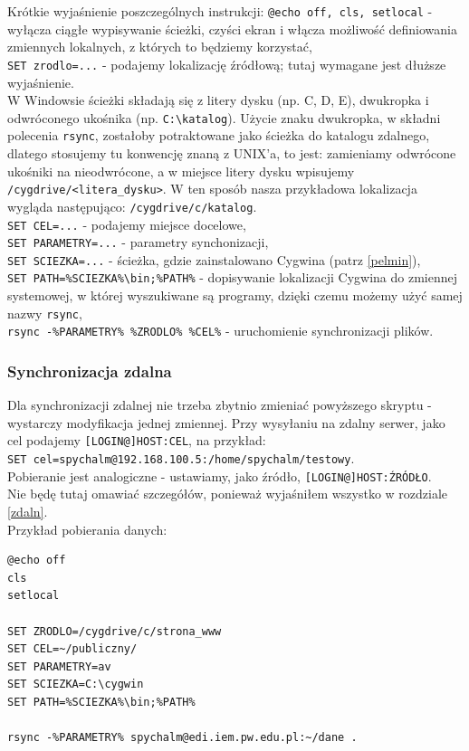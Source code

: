 Krótkie wyjaśnienie poszczególnych instrukcji:
\verb|@echo off, cls, setlocal| - wyłącza ciągłe wypisywanie ścieżki, czyści ekran i włącza możliwość definiowania zmiennych lokalnych, z których to będziemy korzystać,\\
\verb|SET zrodlo=...| - podajemy lokalizację źródłową; tutaj wymagane jest dłuższe wyjaśnienie.\\W Windowsie ścieżki składają się z litery dysku (np. C, D, E), dwukropka i odwróconego ukośnika (np. \verb|C:\katalog|). Użycie znaku dwukropka, w składni polecenia \verb|rsync|, zostałoby potraktowane jako ścieżka do katalogu zdalnego, dlatego stosujemy tu konwencję znaną z UNIX'a, to jest: zamieniamy odwrócone ukośniki na nieodwrócone, a w miejsce litery dysku wpisujemy \verb|/cygdrive/<litera_dysku>|. W ten sposób nasza przykładowa lokalizacja wygląda następująco: \verb|/cygdrive/c/katalog|.\\
\verb|SET CEL=...| - podajemy miejsce docelowe,\\
\verb|SET PARAMETRY=...| - parametry synchonizacji,\\
\verb|SET SCIEZKA=...| - ścieżka, gdzie zainstalowano Cygwina (patrz \ref{pelmin}),\\
\verb|SET PATH=%SCIEZKA%\bin;%PATH%| - dopisywanie lokalizacji Cygwina do zmiennej systemowej, w której wyszukiwane są programy, dzięki czemu możemy użyć samej nazwy \verb|rsync|,\\
\verb|rsync -%PARAMETRY% %ZRODLO% %CEL%| - uruchomienie synchronizacji plików.

\subsubsection{Synchronizacja zdalna}
Dla synchronizacji zdalnej nie trzeba zbytnio zmieniać powyższego skryptu - wystarczy modyfikacja jednej zmiennej. Przy wysyłaniu na zdalny serwer, jako cel podajemy \verb|[LOGIN@]HOST:CEL|, na przykład: \\\verb|SET cel=spychalm@192.168.100.5:/home/spychalm/testowy|. \\
Pobieranie jest analogiczne - ustawiamy, jako źródło, \verb|[LOGIN@]HOST:ŹRÓDŁO|.
\\ Nie będę tutaj omawiać szczegółów, ponieważ wyjaśniłem wszystko w rozdziale \ref{zdaln}. 
\\Przykład pobierania danych:
\begin{verbatim}
@echo off
cls
setlocal

SET ZRODLO=/cygdrive/c/strona_www
SET CEL=~/publiczny/
SET PARAMETRY=av
SET SCIEZKA=C:\cygwin
SET PATH=%SCIEZKA%\bin;%PATH%

rsync -%PARAMETRY% spychalm@edi.iem.pw.edu.pl:~/dane .
\end{verbatim}


